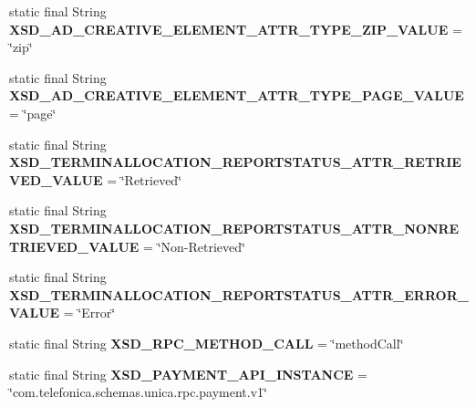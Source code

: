\begin{DoxyCompactItemize}
\item 
\hypertarget{classcom_1_1bluevia_1_1commons_1_1parser_1_1xml_1_1XmlConstants_abf164ddf997901e377eef1e69bfd9a88}{
static final String {\bfseries XSD\_\-AD\_\-CREATIVE\_\-ELEMENT\_\-ATTR\_\-TYPE\_\-ZIP\_\-VALUE} = \char`\"{}zip\char`\"{}}
\label{classcom_1_1bluevia_1_1commons_1_1parser_1_1xml_1_1XmlConstants_abf164ddf997901e377eef1e69bfd9a88}

\item 
\hypertarget{classcom_1_1bluevia_1_1commons_1_1parser_1_1xml_1_1XmlConstants_a1d5c3be917899860f125a3426d518f59}{
static final String {\bfseries XSD\_\-AD\_\-CREATIVE\_\-ELEMENT\_\-ATTR\_\-TYPE\_\-PAGE\_\-VALUE} = \char`\"{}page\char`\"{}}
\label{classcom_1_1bluevia_1_1commons_1_1parser_1_1xml_1_1XmlConstants_a1d5c3be917899860f125a3426d518f59}

\item 
\hypertarget{classcom_1_1bluevia_1_1commons_1_1parser_1_1xml_1_1XmlConstants_ad6d3b252c9a91ff9481d5abb8fa68224}{
static final String {\bfseries XSD\_\-TERMINALLOCATION\_\-REPORTSTATUS\_\-ATTR\_\-RETRIEVED\_\-VALUE} = \char`\"{}Retrieved\char`\"{}}
\label{classcom_1_1bluevia_1_1commons_1_1parser_1_1xml_1_1XmlConstants_ad6d3b252c9a91ff9481d5abb8fa68224}

\item 
\hypertarget{classcom_1_1bluevia_1_1commons_1_1parser_1_1xml_1_1XmlConstants_a19521eda18e5b06df1fa7013260ac4c9}{
static final String {\bfseries XSD\_\-TERMINALLOCATION\_\-REPORTSTATUS\_\-ATTR\_\-NONRETRIEVED\_\-VALUE} = \char`\"{}Non-\/Retrieved\char`\"{}}
\label{classcom_1_1bluevia_1_1commons_1_1parser_1_1xml_1_1XmlConstants_a19521eda18e5b06df1fa7013260ac4c9}

\item 
\hypertarget{classcom_1_1bluevia_1_1commons_1_1parser_1_1xml_1_1XmlConstants_af9a5c10aac310a83c6885e478ff3994f}{
static final String {\bfseries XSD\_\-TERMINALLOCATION\_\-REPORTSTATUS\_\-ATTR\_\-ERROR\_\-VALUE} = \char`\"{}Error\char`\"{}}
\label{classcom_1_1bluevia_1_1commons_1_1parser_1_1xml_1_1XmlConstants_af9a5c10aac310a83c6885e478ff3994f}

\item 
\hypertarget{classcom_1_1bluevia_1_1commons_1_1parser_1_1xml_1_1XmlConstants_a6d217d4f6024b2a1533a84fe68770f50}{
static final String {\bfseries XSD\_\-RPC\_\-METHOD\_\-CALL} = \char`\"{}methodCall\char`\"{}}
\label{classcom_1_1bluevia_1_1commons_1_1parser_1_1xml_1_1XmlConstants_a6d217d4f6024b2a1533a84fe68770f50}

\item 
\hypertarget{classcom_1_1bluevia_1_1commons_1_1parser_1_1xml_1_1XmlConstants_a814809385811c71f926a0faee8a57dbe}{
static final String {\bfseries XSD\_\-PAYMENT\_\-API\_\-INSTANCE} = \char`\"{}com.telefonica.schemas.unica.rpc.payment.v1\char`\"{}}
\label{classcom_1_1bluevia_1_1commons_1_1parser_1_1xml_1_1XmlConstants_a814809385811c71f926a0faee8a57dbe}


\end{DoxyCompactItemize}
